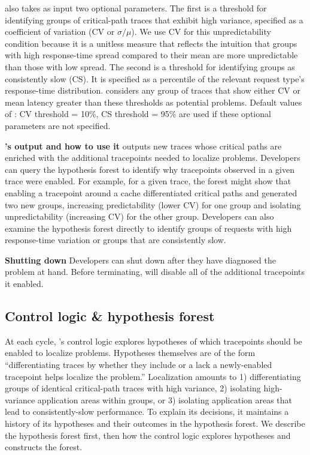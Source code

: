   \STAIF{} also takes as input two optional parameters.  
  The first is a threshold for identifying groups of critical-path
  traces that exhibit high variance, specified as a coefficient of
  variation (CV or $\sigma/\mu$).  We use CV for this unpredictability
  condition because it is a unitless measure that reflects the intuition
  that groups with high response-time spread compared to their mean are
  more unpredictable than those with low spread.  The second is a
  threshold for identifying groups as consistently slow (CS). It is
  specified as a percentile of the relevant request type's response-time
  distribution.  \STAIF{} considers any group of traces that show either
  CV or mean latency greater than these thresholds as potential
  problems.  Default values of : CV threshold = 10\%, CS threshold =
  95\% are used if these optional parameters are not specified.
  
  \noindent\textbf{\STAIF{}'s output and how to use it}
  \STAIF{} outputs new traces whose critical paths
  are enriched with the additional tracepoints needed to localize
  problems.  Developers can query the hypothesis forest to identify why
  tracepoints observed in a given trace were enabled.  For example, for
  a given trace, the forest might show that enabling a tracepoint around
  a cache differentiated critical paths and generated two new groups,
  increasing predictability (lower CV) for one group and isolating
  unpredictability (increasing CV) for the other group.  Developers can
  also examine the hypothesis forest directly to identify groups of
  requests with high response-time variation or groups that are
  consistently slow.
  
  \noindent\textbf{Shutting down \STAIF{}} Developers can shut down \STAIF{}
  after they have diagnosed the problem at hand.  Before
  terminating, \STAIF{} will disable all of the additional tracepoints
  it enabled.

  \subsection{Control logic \& hypothesis forest}
\label{sec:design:control_logic}

At each cycle, \staif{}'s control logic explores hypotheses of which
tracepoints should be enabled to localize problems.  Hypotheses
themselves are of the form ``differentiating traces by whether they
include or a lack a newly-enabled tracepoint helps localize the
problem.''  Localization amounts to 1) differentiating groups of
identical critical-path traces with high variance, 2) isolating
high-variance application areas within groups, or 3) isolating
application areas that lead to consistently-slow performance.  To
explain its decisions, it maintains a history of its hypotheses and
their outcomes in the hypothesis forest.  We describe the hypothesis
forest first, then how the control logic explores hypotheses and
constructs the forest.

